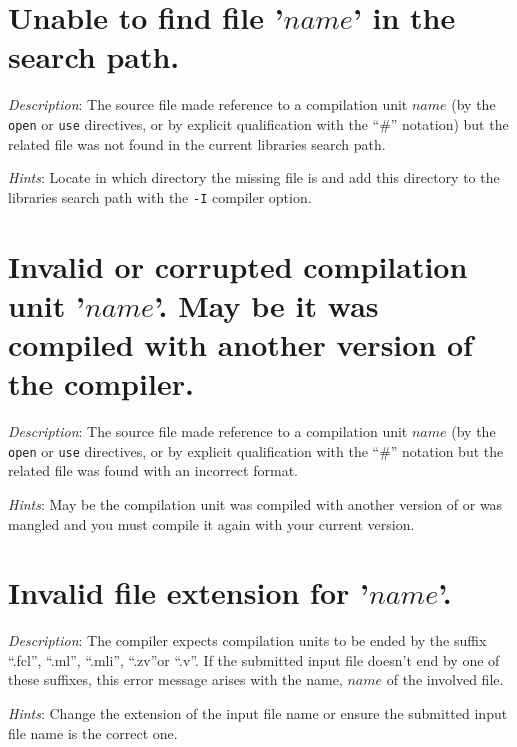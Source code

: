 


\section*{Unable to find file '$name$' in the search path.}

{\em Description}: The source file made reference to a {\focal}
compilation unit
$name$ (by the {\tt open} or {\tt use} directives, or by explicit
qualification with the ``\#'' notation) but the related
{\focal} file was not found in the current libraries search
path.

{\em Hints}: Locate in which directory the missing  file is
and add this directory to the libraries search path with the {\tt -I}
compiler option.



\section*{Invalid or corrupted compilation unit '$name$'. May be it
  was compiled with another version of the compiler.}
{\em Description}: The source file made reference to a {\focal}
compilation unit
$name$ (by the {\tt open} or {\tt use} directives, or by explicit
qualification with the ``\#'' notation but the related
{\focal}  file was found with an incorrect format.

{\em Hints}: May be the compilation unit was compiled with another
version of {\focal} or was mangled and you must compile it again with
your current version.



\section*{Invalid file extension for '$name$'.}
{\em Description}: The {\focal} compiler expects compilation units to be
ended by the suffix ``.fcl'', ``.ml'', ``.mli'', ``.zv''or ``.v''. If
the submitted input file doesn't end by one of these suffixes, this
error message arises with the name, $name$ of the involved file.

{\em Hints}: Change the extension of the input file name or ensure the
submitted input file name is the correct one.



